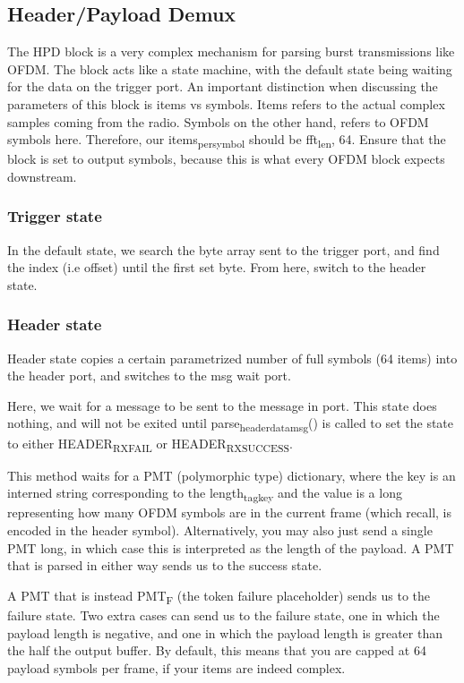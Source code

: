 \documentclass[11pt]{article}
\begin{document}
\subsection{Header/Payload Demux}
\label{sec:orgbbb143d}
The HPD block is a very complex mechanism for parsing burst
transmissions like OFDM. The block acts like a state machine, with the
default state being waiting for the data on the trigger port. An
important distinction when discussing the parameters of this block is
items vs symbols. Items refers to the actual complex samples coming
from the radio. Symbols on the other hand, refers to OFDM symbols
here. Therefore, our items\textsubscript{per}\textsubscript{symbol} should be fft\textsubscript{len}, 64. Ensure
that the block is set to output symbols, because this is what every
OFDM block expects downstream.

\subsubsection{Trigger state}
\label{sec:org215c938}
In the default state, we search the byte array sent to the trigger
port, and find the index (i.e offset) until the first set byte. From
here, switch to the header state.

\subsubsection{Header state}
\label{sec:org8e9503a}
Header state copies a certain parametrized number of full symbols (64
items) into the header port, and switches to the msg wait port.

Here, we wait for a message to be sent to the message in port. This
state does nothing, and will not be exited until
parse\textsubscript{header}\textsubscript{data}\textsubscript{msg}() is called to set the state to either
HEADER\textsubscript{RX}\textsubscript{FAIL} or HEADER\textsubscript{RX}\textsubscript{SUCCESS}.

This method waits for a PMT (polymorphic type) dictionary, where the
key is an interned string corresponding to the length\textsubscript{tag}\textsubscript{key} and the
value is a long representing how many OFDM symbols are in the current
frame (which recall, is encoded in the header symbol). Alternatively,
you may also just send a single PMT long, in which case this is
interpreted as the length of the payload. A PMT that is parsed in
either way sends us to the success state.

A PMT that is instead PMT\textsubscript{F} (the token failure placeholder) sends us
to the failure state. Two extra cases can send us to the failure
state, one in which the payload length is negative, and one in which
the payload length is greater than the half the output buffer. By
default, this means that you are capped at 64 payload symbols per
frame, if your items are indeed complex.
\end{document}
